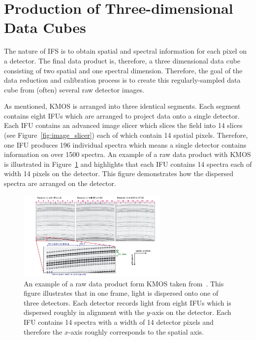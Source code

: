 
\section{Production of Three-dimensional Data Cubes} %
\label{sec:3Ddata}

The nature of IFS is to obtain spatial and spectral information for each pixel on a detector.
The final data product is, therefore, a three dimensional data cube consisting of two spatial and one spectral dimension.
Therefore, the goal of the data reduction and calibration process is to create this regularly-sampled data cube from (often) several raw detector images.

As mentioned, KMOS is arranged into three identical segments.
Each segment contains eight IFUs which are arranged to project data onto a single detector.
Each IFU contains an advanced image slicer which slices the field into 14 slices (see Figure~\ref{fig:image_slicer}) each of which contain 14 spatial pixels.
Therefore, one IFU produces 196 individual spectra which means a single detector contains information on over 1500 spectra.
An example of a raw data product with KMOS is illustrated in Figure~\ref{fig:kmosdata} and highlights that each IFU contains 14 spectra each of width 14 pixels on the detector.
This figure demonstrates how the dispersed spectra are arranged on the detector.

\begin{figure}
 \centering
 \includegraphics[width=0.65\textwidth]{kmos/kmos-data-Davies13}
 \caption[An example of KMOS raw data]{An example of a raw data product form KMOS taken from~\citet{2013A&A...558A..56D}. This figure  illustrates that in one frame, light is dispersed onto one of three detectors.
 Each detector records light from eight IFUs which is dispersed roughly in alignment with the $y$-axis on the detector.
 Each IFU contains 14 spectra with a width of 14 detector pixels and therefore the $x$-axis roughly corresponds to the spatial axis.\label{fig:kmosdata}}
\end{figure}

